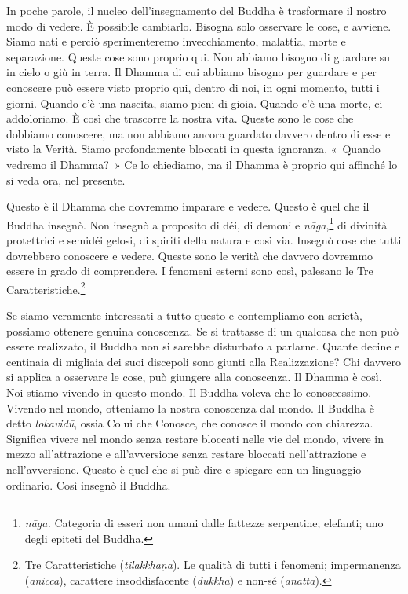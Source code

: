 In poche parole, il nucleo dell'insegnamento del Buddha è trasformare il
nostro modo di vedere. È possibile cambiarlo. Bisogna solo osservare le
cose, e avviene. Siamo nati e perciò sperimenteremo invecchiamento,
malattia, morte e separazione. Queste cose sono proprio qui. Non abbiamo
bisogno di guardare su in cielo o giù in terra. Il Dhamma di cui abbiamo
bisogno per guardare e per conoscere può essere visto proprio qui,
dentro di noi, in ogni momento, tutti i giorni. Quando c'è una nascita,
siamo pieni di gioia. Quando c'è una morte, ci addoloriamo. È così che
trascorre la nostra vita. Queste sono le cose che dobbiamo conoscere, ma
non abbiamo ancora guardato davvero dentro di esse e visto la Verità.
Siamo profondamente bloccati in questa ignoranza. «~Quando vedremo il
Dhamma?~» Ce lo chiediamo, ma il Dhamma è proprio qui affinché lo si
veda ora, nel presente.

Questo è il Dhamma che dovremmo imparare e vedere. Questo è quel che il
Buddha insegnò. Non insegnò a proposito di déi, di demoni e
\emph{nāga},\footnote{\emph{nāga.} Categoria di esseri non umani dalle
  fattezze serpentine; elefanti; uno degli epiteti del Buddha.} di
divinità protettrici e semidéi gelosi, di spiriti della natura e così
via. Insegnò cose che tutti dovrebbero conoscere e vedere. Queste sono
le verità che davvero dovremmo essere in grado di comprendere. I
fenomeni esterni sono così, palesano le Tre Caratteristiche.\footnote{Tre
  Caratteristiche (\emph{tilakkhaṇa}). Le qualità di tutti i fenomeni;
  impermanenza (\emph{anicca}), carattere insoddisfacente
  (\emph{dukkha}) e non-sé (\emph{anatta}).}

Se siamo veramente interessati a tutto questo e contempliamo con
serietà, possiamo ottenere genuina conoscenza. Se si trattasse di un
qualcosa che non può essere realizzato, il Buddha non si sarebbe
disturbato a parlarne. Quante decine e centinaia di migliaia dei suoi
discepoli sono giunti alla Realizzazione? Chi davvero si applica a
osservare le cose, può giungere alla conoscenza. Il Dhamma è così. Noi
stiamo vivendo in questo mondo. Il Buddha voleva che lo conoscessimo.
Vivendo nel mondo, otteniamo la nostra conoscenza dal mondo. Il Buddha è
detto \emph{lokavidū}, ossia Colui che Conosce, che conosce il mondo con
chiarezza. Significa vivere nel mondo senza restare bloccati nelle vie
del mondo, vivere in mezzo all'attrazione e all'avversione senza restare
bloccati nell'attrazione e nell'avversione. Questo è quel che si può
dire e spiegare con un linguaggio ordinario. Così insegnò il Buddha.

